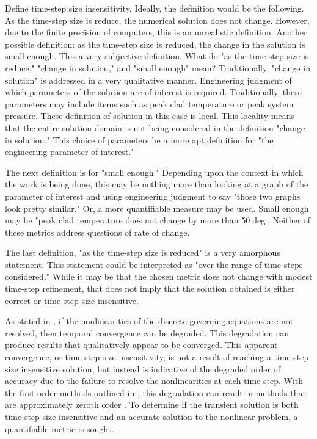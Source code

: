 Define time-step size insensitivity.
Ideally, the definition would be the following.
As the time-step size is reduce, the numerical solution does not change.
However, due to the finite precision of computers, this is an unrealistic definition.
Another possible definition: as the time-step size is reduced, the change in the solution is small enough.
This a very subjective definition.
What do "as the time-step size is reduce," "change in solution," and "small enough" mean?
Traditionally, "change in solution" is addressed in a very qualitative manner.
Engineering judgment of which parameters of the solution are of interest is required.
Traditionally, these parameters may include items such as peak clad temperature or peak system pressure.
These definition of solution in this case is local.
This locality means that the entire solution domain is not being considered in the definition "change in solution."
This choice of parameters be a more apt definition for "the engineering parameter of interest."

The next definition is for "small enough."
Depending upon the context in which the work is being done, this may be nothing more than looking at a graph of the parameter of interest and using engineering judgment to say "those two graphs look pretty similar."
Or, a more quantifiable measure may be used.
Small enough may be "peak clad temperature does not change by more than 50$\deg$.
Neither of these metrics address questions of rate of change.

The last definition, "as the time-step size is reduced" is a very amorphous statement.
This statement could be interpreted as "over the range of time-steps considered."
While it may be that the chosen metric does not change with modest time-step refinement, that does not imply that the solution obtained is either correct or time-step size insensitive.

As stated in , if the nonlinearities of the discrete governing equations are not resolved, then temporal convergence can be degraded.
This degradation can produce results that qualitatively appear to be converged.
This apparent convergence, or time-step size insensitivity, is not a result of reaching a time-step size insensitive solution, but instead is indicative of the degraded order of accuracy due to the failure to resolve the nonlinearities at each time-step.
With the first-order methods outlined in , this degradation can result in methods that are approximately zeroth order \cite{Knoll2001}.
To determine if the transient solution is both time-step size insensitive and an accurate solution to the nonlinear problem, a quantifiable metric is sought.

